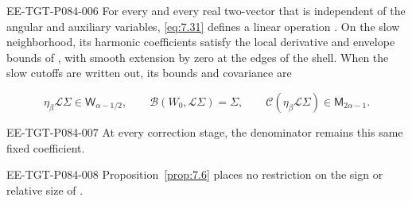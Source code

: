 \begin{proposition}\label{prop:7.6}
\begin{EESegment}{EE-TGT-P084-006}
For every  and every real two-vector  that is independent of the angular and auxiliary variables, \eqref{eq:7.31} defines a linear operation . On the slow neighborhood, its harmonic coefficients satisfy the local derivative and envelope bounds of , with smooth extension by zero at the edges of the shell. When the slow cutoffs are written out, its bounds and covariance are
\end{EESegment}
\begin{equation}
  \eta_\beta\mathcal L\Sigma\in\mathsf W_{\alpha-1/2},
  \qquad
  \mathcal B(W_0,\mathcal L\Sigma)=\Sigma,
  \qquad
  \mathcal C(\eta_\beta\mathcal L\Sigma)\in\mathsf M_{2\alpha-1}.
  \tag{7.32}\label{eq:7.32}
\end{equation}
\begin{EESegment}{EE-TGT-P084-007}
At every correction stage, the denominator  remains this same fixed coefficient.
\end{EESegment}
\end{proposition}

\begin{EESegment}{EE-TGT-P084-008}
Proposition~\ref{prop:7.6} places no restriction on the sign or relative size of .
\end{EESegment}

